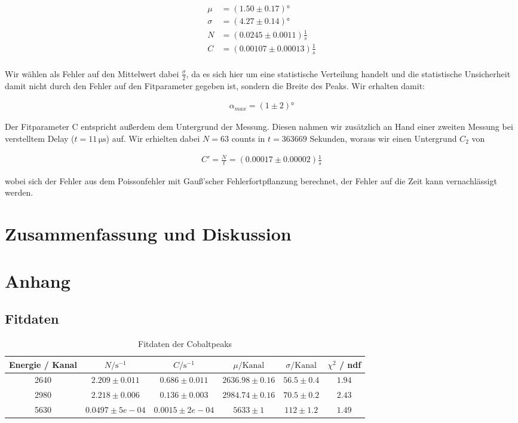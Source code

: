 \documentclass[12pt,listof=totoc]{scrartcl}
\begin{document}
\begin{align*}
\mu &= (1.50 \pm 0.17) °\\
\sigma &= (4.27 \pm 0.14) °\\
N &= (0.0245 \pm 0.0011) \frac{1}{s}\\
C &= (0.00107 \pm 0.00013)\frac{1}{s}\\
\end{align*}

Wir wählen als Fehler auf den Mittelwert dabei $\frac{\sigma}{2}$, da es sich hier um eine statistische Verteilung handelt und die statistische Unsicherheit damit nicht durch den Fehler auf den Fitparameter gegeben ist, sondern die Breite des Peaks. Wir erhalten damit:

\begin{align}
\alpha_{max} = (1 \pm 2)°
\end{align}

Der Fitparameter C entspricht außerdem dem Untergrund der Messung.
Diesen nahmen wir zusätzlich an Hand einer zweiten Messung bei verstelltem Delay ($t=11\,\mathrm{\mu s}$) auf. Wir erhielten dabei $N=63$ counts in $t=363669$  Sekunden, woraus wir einen Untergrund $C_2$ von 

\begin{align}
C' = \frac{N}{t} = ( 0.00017 \pm 0.00002) \frac{1}{s} 
\end{align} 

wobei sich der Fehler aus dem Poissonfehler mit Gauß'scher Fehlerfortpflanzung berechnet, der Fehler auf die Zeit kann vernachlässigt werden.



\newpage
\section{Zusammenfassung und Diskussion \label{Diskussion}}


\newpage
\section{Anhang}
\subsection{Fitdaten}

\begin{table}[h!]
	\footnotesize\centering
	\begin{tabular}{|c||c|c|c|c||c|}
		\hline
		Energie / Kanal&$N/\mathrm{s^{-1}}$&$C/\mathrm{s^{-1}}$&$\mu/\mathrm{Kanal}$&$\sigma/\mathrm{Kanal}$&$\chi^2$ / ndf\\\hline\hline2640&$2.209\pm0.011$&$0.686\pm0.011$&$2636.98\pm0.16$&$56.5\pm0.4$&$1.94$\\
		2980&$2.218\pm0.006$&$0.136\pm0.003$&$2984.74\pm0.16$&$70.5\pm0.2$&$2.43$\\
		5630&$0.0497\pm5e-04$&$0.0015\pm2e-04$&$5633\pm1$&$112\pm1.2$&$1.49$\\
		\hline\end{tabular}
	\caption{Fitdaten der Cobaltpeaks\label{cobalttable}}
\end{table}
\end{document}
